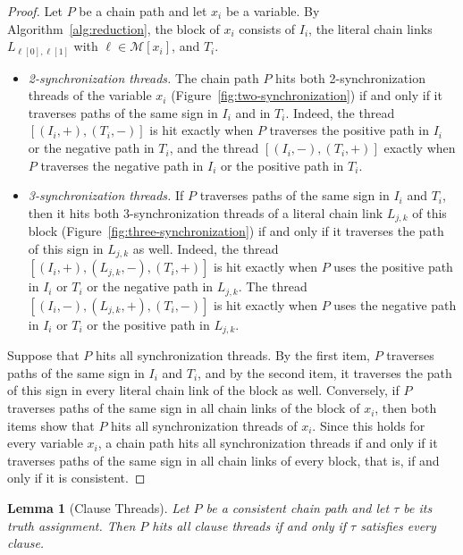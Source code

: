 \documentclass[a4paper,fleqn]{cas-sc}
\numberwithin{equation}{section}
\theoremstyle{definition}
\theoremstyle{plain}
\newtheorem{lemma}[definition]{Lemma}
\theoremstyle{remark}
\begin{document}
\begin{proof}
Let $P$ be a chain path and let $x_i$ be a variable.
By Algorithm~\ref{alg:reduction}, the block of $x_i$ consists of $I_i$, the literal chain links $L_{\ell[0],\ell[1]}$ with $\ell \in \mathcal{M}[x_i]$, and $T_i$.
\begin{itemize}
    \item \emph{2-synchronization threads.} The chain path $P$ hits both 2-synchronization threads of the variable $x_i$ (Figure~\ref{fig:two-synchronization}) if and only if it traverses paths of the same sign in $I_i$ and in $T_i$.
    Indeed, the thread $[(I_i,+),(T_i,-)]$ is hit exactly when $P$ traverses the positive path in $I_i$ or the negative path in $T_i$, and the thread $[(I_i,-),(T_i,+)]$ exactly when $P$ traverses the negative path in $I_i$ or the positive path in $T_i$.
    \item \emph{3-synchronization threads.} If $P$ traverses paths of the same sign in $I_i$ and $T_i$, then it hits both 3-synchronization threads of a literal chain link $L_{j,k}$ of this block (Figure~\ref{fig:three-synchronization}) if and only if it traverses the path of this sign in $L_{j,k}$ as well.
    Indeed, the thread $[(I_i,+),(L_{j,k},-),(T_i,+)]$ is hit exactly when $P$ uses the positive path in $I_i$ or $T_i$ or the negative path in $L_{j,k}$.
    The thread $[(I_i,-),(L_{j,k},+),(T_i,-)]$ is hit exactly when $P$ uses the negative path in $I_i$ or $T_i$ or the positive path in $L_{j,k}$.
\end{itemize}
Suppose that $P$ hits all synchronization threads.
By the first item, $P$ traverses paths of the same sign in $I_i$ and $T_i$, and by the second item, it traverses the path of this sign in every literal chain link of the block as well.
Conversely, if $P$ traverses paths of the same sign in all chain links of the block of $x_i$, then both items show that $P$ hits all synchronization threads of $x_i$.
Since this holds for every variable $x_i$, a chain path hits all synchronization threads if and only if it traverses paths of the same sign in all chain links of every block, that is, if and only if it is consistent.
\end{proof}

\begin{lemma}[Clause Threads]
\label{lem:clause-threads}
Let $P$ be a consistent chain path and let $\tau$ be its truth assignment.
Then $P$ hits all clause threads if and only if $\tau$ satisfies every clause.
\end{lemma}
\end{document}
